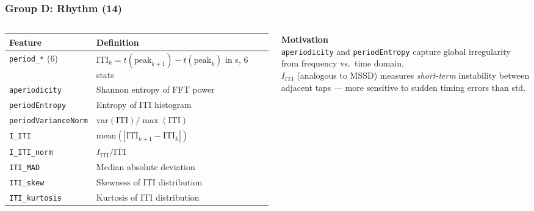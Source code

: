 \documentclass[aspectratio=169]{beamer}
\begin{document}
\begin{frame}
    \frametitle{Group D: Rhythm (14)}
    \scriptsize
    \begin{columns}[T]
        \renewcommand{\arraystretch}{1.2}
        \begin{tabular}{p{3.4cm}p{3.6cm}}
            \toprule
            \textbf{Feature} & \textbf{Definition} \\
            \midrule
            \texttt{period\_*} (6) & $\text{ITI}_k = t(\text{peak}_{k+1})-t(\text{peak}_k)$ in s, 6 stats \\
            \texttt{aperiodicity} & Shannon entropy of FFT power \\
            \texttt{periodEntropy} & Entropy of ITI histogram \\
            \texttt{periodVarianceNorm} & $\mathrm{var(ITI)}/\max(\mathrm{ITI})$ \\
            \texttt{I\_ITI} & $\mathrm{mean}(|\text{ITI}_{k+1}-\text{ITI}_k|)$ \\
            \texttt{I\_ITI\_norm} & $I_\text{ITI}/\bar{\text{ITI}}$ \\
            \texttt{ITI\_MAD} & Median absolute deviation \\
            \texttt{ITI\_skew} & Skewness of ITI distribution \\
            \texttt{ITI\_kurtosis} & Kurtosis of ITI distribution \\
            \bottomrule
        \end{tabular}

        \textbf{Motivation}\\[0.3em]
        \texttt{aperiodicity} and \texttt{periodEntropy} capture global irregularity from frequency vs.\ time domain.\\[0.4em]
        $I_\text{ITI}$ (analogous to MSSD) measures \emph{short-term} instability between adjacent taps --- more sensitive to sudden timing errors than std.
    \end{columns}
\end{frame}
\end{document}

